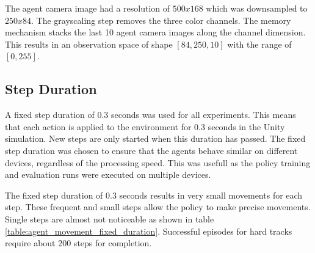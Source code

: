 The agent camera image had a resolution of $500x168$ which was downsampled to $250x84$. The grayscaling step removes the three color channels. The memory mechanism stacks the last 10 agent camera images along the channel dimension. This results in an observation space of shape $[84, 250, 10]$ with the range of $[0, 255]$.

\subsection{Step Duration}
\label{sec:step_duration_experiment}

A fixed step duration of 0.3 seconds was used for all experiments. This means that each action is applied to the environment for 0.3 seconds in the Unity simulation. New steps are only started when this duration has passed. The fixed step duration was chosen to ensure that the agents behave similar on different devices, regardless of the processing speed. This was usefull as the policy training and evaluation runs were executed on multiple devices.

The fixed step duration of 0.3 seconds results in very small movements for each step. These frequent and small steps allow the policy to make precise movements. Single steps are almost not noticeable as shown in table \ref{table:agent_movement_fixed_duration}. Successful episodes for hard tracks require about 200 steps for completion.


